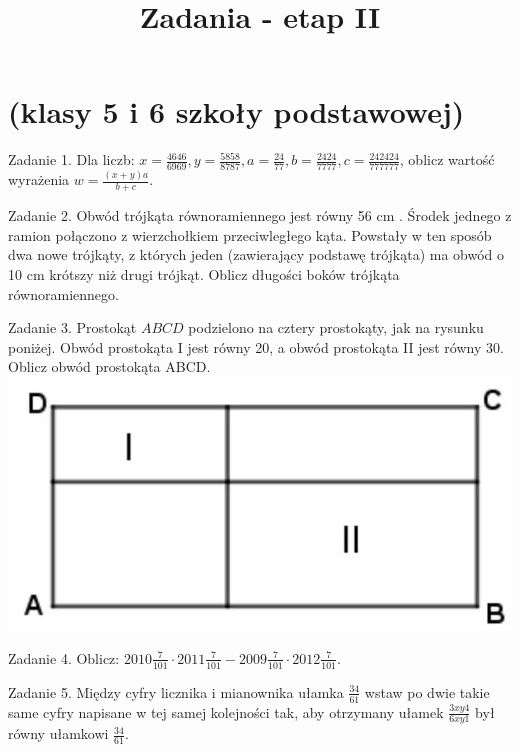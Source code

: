 \documentclass[10pt]{article}
\title{Zadania - etap II }
\author{}
\date{}
\begin{document}
\maketitle
\section*{(klasy 5 i 6 szkoły podstawowej)}
Zadanie 1. Dla liczb: \(x=\frac{4646}{6969}, y=\frac{5858}{8787}, a=\frac{24}{77}, b=\frac{2424}{7777}, c=\frac{242424}{777777}\), oblicz wartość wyrażenia \(w=\frac{(x+y) a}{b+c}\).

Zadanie 2. Obwód trójkąta równoramiennego jest równy 56 cm . Środek jednego z ramion połączono z wierzchołkiem przeciwległego kąta. Powstały w ten sposób dwa nowe trójkąty, z których jeden (zawierający podstawę trójkąta) ma obwód o 10 cm krótszy niż drugi trójkąt. Oblicz długości boków trójkąta równoramiennego.

Zadanie 3. Prostokąt \(A B C D\) podzielono na cztery prostokąty, jak na rysunku poniżej. Obwód prostokąta I jest równy 20, a obwód prostokąta II jest równy 30. Oblicz obwód prostokąta ABCD.\\
\includegraphics[max width=\textwidth, center]{2024_11_21_a91ed06327e40136c6d4g-1}

Zadanie 4. Oblicz: \(2010 \frac{7}{101} \cdot 2011 \frac{7}{101}-2009 \frac{7}{101} \cdot 2012 \frac{7}{101}\).

Zadanie 5. Między cyfry licznika i mianownika ułamka \(\frac{34}{61}\) wstaw po dwie takie same cyfry napisane w tej samej kolejności tak, aby otrzymany ułamek \(\frac{3 x y 4}{6 x y 1}\) był równy ułamkowi \(\frac{34}{61}\).
\end{document}
